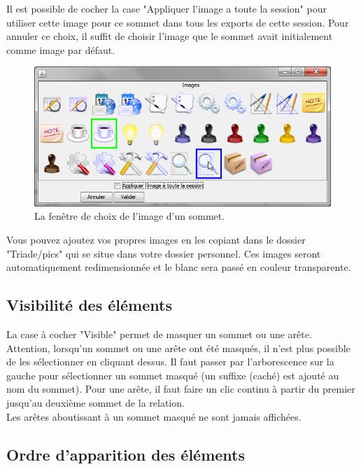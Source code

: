 Il est possible de cocher la case "Appliquer l'image a toute la session" pour utiliser cette image pour ce sommet dans tous les exports de cette session. Pour annuler ce choix, il suffit de choisir l'image que le sommet avait initialement comme image par défaut.\\ 

\begin{figure}[h!]
\centering
\includegraphics[scale=0.65]{images/choix_image.png}
\caption{La fenêtre de choix de l'image d'un sommet.}
\end{figure}

 Vous pouvez ajoutez vos propres images en les copiant dans le dossier "Triade/pics" qui se situe dans votre dossier personnel. Ces images seront automatiquement redimensionnée et le blanc sera passé en couleur transparente.\\


\subsection{Visibilité des éléments}
La case à cocher "Visible" permet de masquer un sommet ou une arête. Attention, lorsqu'un sommet ou une arête ont été masqués, il n'est plus possible de les sélectionner en cliquant dessus. Il faut passer par l'arborescence sur la gauche pour sélectionner un sommet masqué (un suffixe (caché) est ajouté au nom du sommet). Pour une arête, il faut faire un clic continu à partir du premier jusqu'au deuxième sommet de la relation.\\

Les arêtes aboutissant à un sommet masqué ne sont jamais affichées.\\



\subsection{Ordre d'apparition des éléments}

